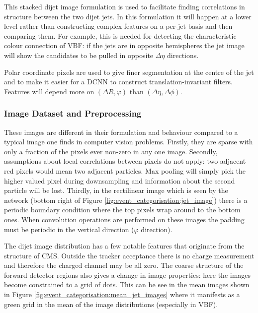 
This stacked dijet image formulation is used to facilitate finding correlations in structure between the two dijet jets. 
In this formulation it will happen at a lower level rather than constructing complex features on a per-jet basis and then comparing them. 
For example, this is needed for detecting the characteristic colour connection of VBF: if the jets are in opposite hemispheres the jet image will show the candidates to be pulled in opposite $\Delta\eta$ directions. 

Polar coordinate pixels are used to give finer segmentation at the centre of the jet and to make it easier for a DCNN to construct translation-invariant filters. Features will depend more on $(\Delta{R},\varphi)$ than $(\Delta\eta,\Delta\phi)$. 


\subsubsection{Image Dataset and Preprocessing}
These images are different in their formulation and behaviour compared to a typical image one finds in computer vision problems.
Firstly, they are sparse with only a fraction of the pixels ever non-zero in any one image. 
Secondly, assumptions about local correlations between pixels do not apply: two adjacent red pixels would mean two adjacent particles. Max pooling will simply pick the higher valued pixel during downsampling and information about the second particle will be lost. 
Thirdly, in the rectilinear image which is seen by the network (bottom right of Figure \ref{fig:event_categorisation:jet_image}) there is a periodic boundary condition where the top pixels wrap around to the bottom ones. When convolution operations are performed on these images the padding must be periodic in the vertical direction ($\varphi$ direction).

The dijet image distribution has a few notable features that originate from the structure of CMS. Outside the tracker acceptance there is no charge measurement and therefore the charged \pt channel may be all zero. The coarse structure of the forward detector regions also gives a change in image properties: here the images become constrained to a grid of dots. This can be see in the mean images shown in Figure \ref{fig:event_categorisation:mean_jet_images} where it manifests as a green grid in the mean of the image distributions (especially in VBF).

